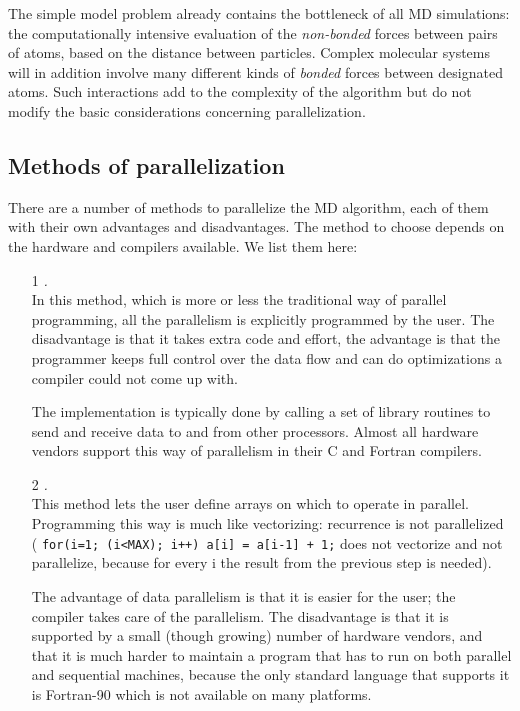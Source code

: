 The simple model problem already contains the bottleneck of all MD 
simulations: the computationally intensive evaluation of the 
{\em non-bonded} forces between pairs of atoms, based on the distance 
between particles. Complex molecular systems will in addition 
involve many different kinds of {\em bonded} forces between designated 
atoms. Such interactions add to the complexity of the algorithm but do 
not modify the basic considerations concerning parallelization.


\subsection{Methods of parallelization}
There are a number of methods to parallelize the MD algorithm, each of
them with their own advantages and disadvantages. The method to 
choose depends on the hardware and compilers available.
We list them here:
\begin{enumerate}
\item[1]        {\em {}.}\\
                In this method, which is more or less the traditional
                way of parallel programming, all the parallelism is
                explicitly programmed by the user. The disadvantage
                is that it takes extra code and effort, the advantage
                is that the programmer keeps full control over the data
                flow and can do optimizations a compiler could not come 
                up with. 

                The implementation is typically done by calling a set of 
                library routines to send and receive data to and from 
                other processors. Almost all hardware vendors support 
                this way of
                parallelism in their C and Fortran compilers.
                
\item[2]        {\em {}.}\\
                This method lets the user define arrays on which to
                operate in parallel. Programming this way is much
                like vectorizing: recurrence is not parallelized
                ({\eg} {\tt for(i=1; (i<MAX); i++) a[i] = a[i-1] + 1;}
                does not vectorize and not parallelize, because for
                every i the result from the previous step is needed).

                The advantage of data parallelism is that it is
                easier for the user; the compiler takes care of the
                parallelism. The disadvantage is that it is supported
                by a small (though growing) number of hardware vendors,
                and that it is much harder to maintain a program that has to
                run on both parallel and sequential machines, because
                the only standard language that supports it is Fortran-90
                which is not available on many platforms.
\end{enumerate}
